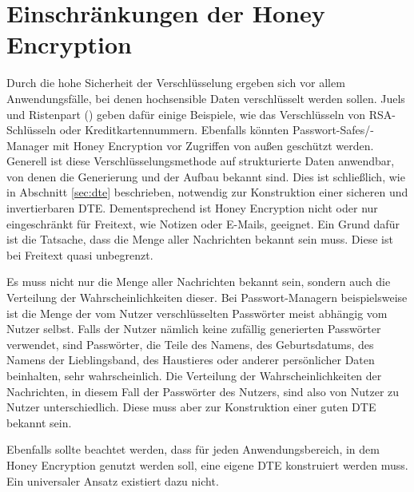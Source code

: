 \section{Einschränkungen der Honey Encryption}
\label{sec:probleme}

Durch die hohe Sicherheit der Verschlüsselung ergeben sich vor allem Anwendungsfälle, bei denen hochsensible Daten verschlüsselt werden sollen. Juels und Ristenpart (\cite{EURO2014, IEEE2014}) geben dafür einige Beispiele, wie das Verschlüsseln von RSA-Schlüsseln oder Kreditkartennummern. Ebenfalls könnten Passwort-Safes/-Manager mit Honey Encryption vor Zugriffen von außen geschützt werden. Generell ist diese Verschlüsselungsmethode auf strukturierte Daten anwendbar, von denen die Generierung und der Aufbau bekannt sind. Dies ist schließlich, wie in Abschnitt \ref{sec:dte} beschrieben, notwendig zur Konstruktion einer sicheren und invertierbaren DTE. Dementsprechend ist Honey Encryption nicht oder nur eingeschränkt für Freitext, wie Notizen oder E-Mails, geeignet. Ein Grund dafür ist die Tatsache, dass die Menge aller Nachrichten bekannt sein muss. Diese ist bei Freitext quasi unbegrenzt.

Es muss nicht nur die Menge aller Nachrichten bekannt sein, sondern auch die Verteilung der Wahrscheinlichkeiten dieser. Bei Passwort-Managern beispielsweise ist die Menge der vom Nutzer verschlüsselten Passwörter meist abhängig vom Nutzer selbst. Falls der Nutzer nämlich keine zufällig generierten Passwörter verwendet, sind Passwörter, die Teile des Namens, des Geburtsdatums, des Namens der Lieblingsband, des Haustieres oder anderer persönlicher Daten beinhalten, sehr wahrscheinlich. Die Verteilung der Wahrscheinlichkeiten der Nachrichten, in diesem Fall der Passwörter des Nutzers, sind also von Nutzer zu Nutzer unterschiedlich. Diese muss aber zur Konstruktion einer guten DTE bekannt sein.

Ebenfalls sollte beachtet werden, dass für jeden Anwendungsbereich, in dem Honey Encryption genutzt werden soll, eine eigene DTE konstruiert werden muss. Ein universaler Ansatz existiert dazu nicht.

